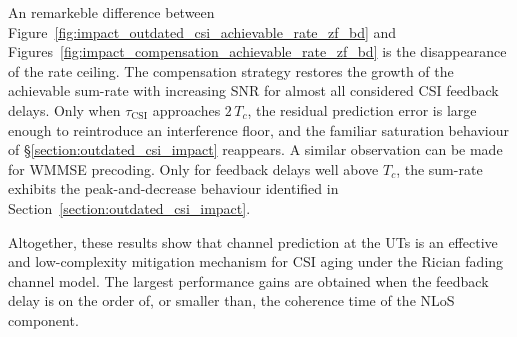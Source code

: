 An remarkeble difference between Figure~\ref{fig:impact_outdated_csi_achievable_rate_zf_bd} and Figures~\ref{fig:impact_compensation_achievable_rate_zf_bd} is the disappearance of the rate ceiling.
The compensation strategy restores the growth of the achievable sum-rate with increasing \ac{SNR} for almost all considered \ac{CSI} feedback delays.
Only when $\tau_{\mathrm{CSI}}$ approaches $2\,T_c$, the residual prediction error is large enough to reintroduce an interference floor, and the familiar saturation behaviour of §\ref{section:outdated_csi_impact} reappears.
A similar observation can be made for \ac{WMMSE} precoding.
Only for feedback delays well above $T_c$, the sum-rate exhibits the peak-and-decrease behaviour identified in Section~\ref{section:outdated_csi_impact}.

Altogether, these results show that channel prediction at the \acp{UT} is an effective and low-complexity mitigation mechanism for \ac{CSI} aging under the Rician fading channel model.
The largest performance gains are obtained when the feedback delay is on the order of, or smaller than, the coherence time of the \ac{NLoS} component.

